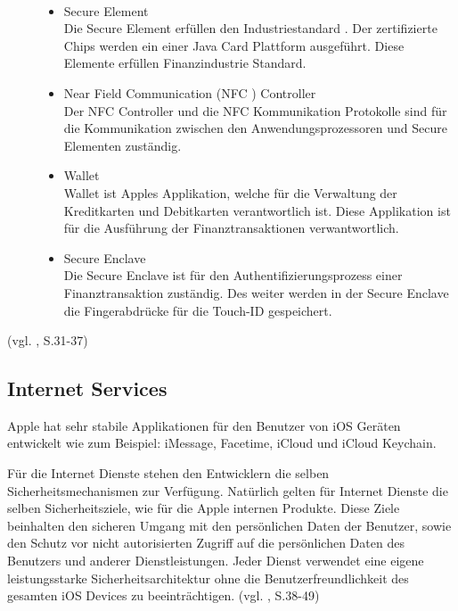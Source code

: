 \begin{description}
\item[\parbox{\textwidth} {Folgende Komponenten gehören zum \glqq Apple
Pay\grqq{} Produkt}]~\par
	\begin{itemize}
		\item Secure Element \\
Die Secure Element erfüllen den Industriestandard . Der zertifizierte Chips
werden ein einer Java Card Plattform ausgeführt.
		Diese Elemente erfüllen Finanzindustrie Standard. 
 		\item Near Field Communication (NFC ) Controller \\
Der NFC Controller und die NFC Kommunikation Protokolle sind für die
Kommunikation zwischen den Anwendungsprozessoren und Secure Elementen zuständig.
 		\item Wallet \\
Wallet ist Apples Applikation,  welche für die Verwaltung der Kreditkarten und
Debitkarten verantwortlich ist. Diese Applikation ist für die Ausführung der
Finanztransaktionen verwantwortlich.
 		\item Secure Enclave \\
Die \glqq Secure Enclave\grqq{} ist für den Authentifizierungsprozess einer
Finanztransaktion zuständig. Des weiter werden in der  \glqq Secure
Enclave\grqq{}  die Fingerabdrücke für die Touch-ID gespeichert.
        \end{itemize}
\end{description}
(vgl. \cite{Apple[4]}, S.31-37)
\subsection{Internet Services}
\label{sec:InternetServices}

Apple hat sehr stabile Applikationen für den Benutzer von iOS Geräten
entwickelt wie zum Beispiel: iMessage, Facetime, iCloud und iCloud Keychain. 

Für die Internet Dienste stehen den Entwicklern die selben
Sicherheitsmechanismen zur Verfügung. Natürlich gelten für Internet Dienste die
selben Sicherheitsziele, wie für die Apple internen Produkte. 
Diese Ziele beinhalten den sicheren Umgang mit den persönlichen Daten der
Benutzer, sowie den Schutz vor nicht autorisierten Zugriff auf die persönlichen
Daten des Benutzers und anderer Dienstleistungen.
Jeder Dienst verwendet eine eigene leistungsstarke Sicherheitsarchitektur ohne
die Benutzerfreundlichkeit des gesamten iOS Devices zu beeinträchtigen. (vgl.
\cite{Apple[4]}, S.38-49)

